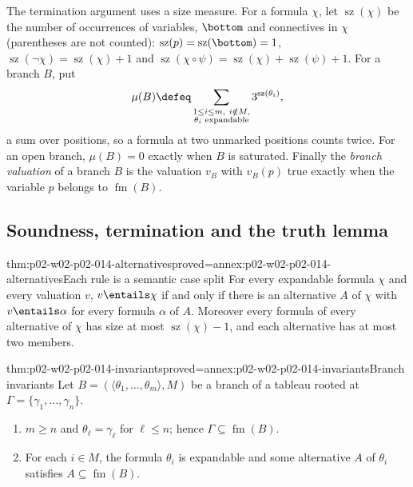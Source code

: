The termination argument uses a size measure.  For a formula \(\chi\), let
\(\operatorname{sz}(\chi)\) be the number of occurrences of variables,
\(\bottom\) and connectives in \(\chi\) (parentheses are not counted):
\(\operatorname{sz}(p)=\operatorname{sz}(\bottom)=1\),
\(\operatorname{sz}(\neg\chi)=\operatorname{sz}(\chi)+1\) and
\(\operatorname{sz}(\chi\circ\psi)=\operatorname{sz}(\chi)+\operatorname{sz}(\psi)+1\).
For a branch \(B\), put
\[
  \mu(B)\defeq\sum_{\substack{1\leq i\leq m,\ i\notin M,\\
     \theta_i\text{ expandable}}}3^{\operatorname{sz}(\theta_i)},
\]
a sum over positions, so a formula at two unmarked positions counts twice.
For an open branch, \(\mu(B)=0\) exactly
when \(B\) is saturated.  Finally the \emph{branch valuation} of a branch
\(B\) is the valuation \(v_B\) with \(v_B(p)\) true exactly when the variable
\(p\) belongs to \(\operatorname{fm}(B)\).

\subsection{Soundness, termination and the truth lemma}
\label{sec:p02-w02-p02-014-results}

\begin{hblemma}{thm:p02-w02-p02-014-alternatives}{proved=annex:p02-w02-p02-014-alternatives}{Each rule is a semantic case split}
For every expandable formula \(\chi\) and every valuation \(v\),
\(v\entails\chi\) if and only if there is an alternative \(A\) of \(\chi\)
with \(v\entails\alpha\) for every formula \(\alpha\) of \(A\).  Moreover
every formula of every alternative of \(\chi\) has size at most
\(\operatorname{sz}(\chi)-1\), and each alternative has at most two members.
\end{hblemma}

\begin{hblemma}{thm:p02-w02-p02-014-invariants}{proved=annex:p02-w02-p02-014-invariants}{Branch invariants}
Let \(B=(\langle\theta_1,\ldots,\theta_m\rangle,M)\) be a branch of a tableau
rooted at \(\Gamma=\{\gamma_1,\ldots,\gamma_n\}\).
\begin{enumerate}
  \item \(m\geq n\) and \(\theta_\ell=\gamma_\ell\) for \(\ell\leq n\); hence
        \(\Gamma\subseteq\operatorname{fm}(B)\).
  \item For each \(i\in M\), the formula \(\theta_i\) is expandable and some
        alternative \(A\) of \(\theta_i\) satisfies \(A\subseteq\operatorname{fm}(B)\).
\end{enumerate}
\end{hblemma}

